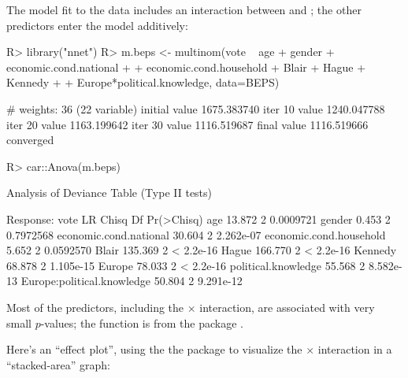 \documentclass[
]{jss}
\begin{document}
The model fit to the data includes an interaction between 
and ; the other predictors enter the model
additively:

\begin{CodeChunk}
\begin{CodeInput}
R> library("nnet")
R> m.beps <- multinom(vote ~ age + gender + economic.cond.national +
+                        economic.cond.household + Blair + Hague + Kennedy +
+                        Europe*political.knowledge, data=BEPS)
\end{CodeInput}
\begin{CodeOutput}
# weights:  36 (22 variable)
initial  value 1675.383740 
iter  10 value 1240.047788
iter  20 value 1163.199642
iter  30 value 1116.519687
final  value 1116.519666 
converged
\end{CodeOutput}
\begin{CodeInput}
R> car::Anova(m.beps)
\end{CodeInput}
\begin{CodeOutput}
Analysis of Deviance Table (Type II tests)

Response: vote
                           LR Chisq Df Pr(>Chisq)
age                          13.872  2  0.0009721
gender                        0.453  2  0.7972568
economic.cond.national       30.604  2  2.262e-07
economic.cond.household       5.652  2  0.0592570
Blair                       135.369  2  < 2.2e-16
Hague                       166.770  2  < 2.2e-16
Kennedy                      68.878  2  1.105e-15
Europe                       78.033  2  < 2.2e-16
political.knowledge          55.568  2  8.582e-13
Europe:political.knowledge   50.804  2  9.291e-12
\end{CodeOutput}
\end{CodeChunk}

Most of the predictors, including the  \(\times\)
 interaction, are associated with very small
\(p\)-values; the  function is from the  package
\citep{FoxWeisberg:2019}.

Here's an ``effect plot'', using the the  package
\citep{FoxWeisberg:2019} to visualize the  \(\times\)
 interaction in a ``stacked-area'' graph:
\end{document}

